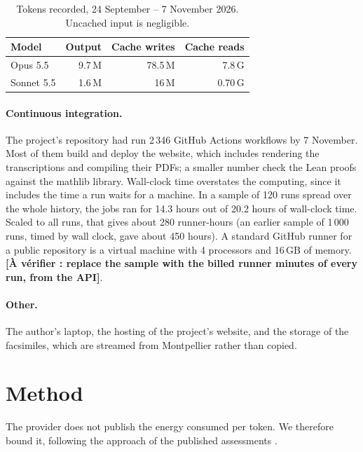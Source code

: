 \documentclass[11pt,a4paper]{article}
\newcommand{\todo}[1]{\textbf{[À vérifier : #1]}}
\begin{document}
\begin{table}[h]\centering
\begin{tabular}{lrrr}
\toprule
Model & Output & Cache writes & Cache reads\\
\midrule
Opus 5.5 & 9.7\,M & 78.5\,M & 7.8\,G\\
Sonnet 5.5 & 1.6\,M & 16\,M & 0.70\,G\\
\bottomrule
\end{tabular}
\caption{Tokens recorded, 24 September -- 7 November 2026. Uncached input is negligible.}\label{tab:tokens}
\end{table}

\paragraph{Continuous integration.} The project's repository had run 2\,346 GitHub Actions workflows by 7 November. Most of them build and deploy the website, which includes rendering the transcriptions and compiling their PDFs; a smaller number check the Lean proofs against the mathlib library. Wall-clock time overstates the computing, since it includes the time a run waits for a machine. In a sample of 120 runs spread over the whole history, the jobs ran for 14.3 hours out of 20.2 hours of wall-clock time. Scaled to all runs, that gives about 280 runner-hours (an earlier sample of 1\,000 runs, timed by wall clock, gave about 450 hours). A standard GitHub runner for a public repository is a virtual machine with 4 processors and 16\,GB of memory. \todo{replace the sample with the billed runner minutes of every run, from the API}.

\paragraph{Other.} The author's laptop, the hosting of the project's website, and the storage of the facsimiles, which are streamed from Montpellier rather than copied.

\section{Method}

The provider does not publish the energy consumed per token. We therefore bound it, following the approach of the published assessments \citep{luccioni2023,ligozat2022}.
\end{document}
